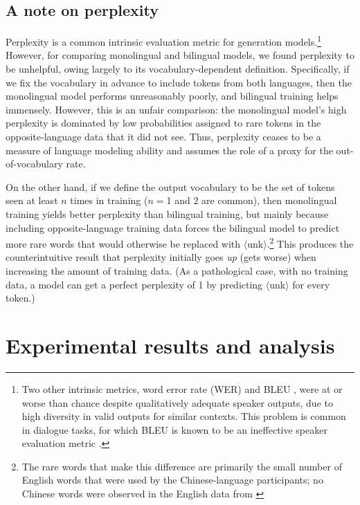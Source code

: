 \documentclass[11pt,a4paper]{article}
\renewcommand{\|}{\mid}
\begin{document}
\subsection{A note on perplexity}

Perplexity is a common intrinsic evaluation metric for generation
models.\footnote{Two other intrinsic metrics, word error
rate (WER) and BLEU \cite{Papineni2002}, were at or worse than
chance despite qualitatively adequate speaker outputs, due to high diversity in valid 
outputs for similar contexts. This problem is common in dialogue tasks,
for which BLEU is known to be an ineffective speaker evaluation metric \cite{Liu2016}.}
However, for comparing monolingual and bilingual models,
we found perplexity to be
unhelpful, owing largely to its vocabulary-dependent definition. Specifically, if we fix the vocabulary in advance to include tokens
from both languages, then the monolingual model performs
unreasonably poorly, and bilingual training helps immensely. However, this is an unfair comparison: the monolingual model's high perplexity
is dominated by low probabilities assigned to rare tokens in the opposite-language data that it did not see. Thus, perplexity ceases to
be a measure of language modeling ability and assumes the role of a proxy for the out-of-vocabulary rate.

On the other hand, if we define the output vocabulary
to be the set of tokens seen at least $n$ times in training ($n={}$1 and 2 are common), then monolingual training yields
better perplexity than bilingual training, but mainly because including opposite-language training data forces the
bilingual model to predict more rare words that would otherwise be replaced with $\langle$unk$\rangle$.\footnote{The rare
words that make this difference are primarily the small number of English words that were used by the Chinese-language participants;
no Chinese words were observed in the English data from \citet{Monroe2017}} %
This produces the counterintuitive result that perplexity initially goes \emph{up} (gets worse) when increasing the amount of
training data. (As a pathological case, with no training data, a model can get a perfect perplexity
of 1 by predicting $\langle$unk$\rangle$ for every token.)

\section{Experimental results and analysis}
\end{document}
